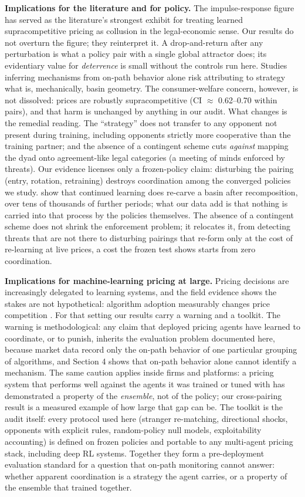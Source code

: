 \documentclass[sigconf]{acmart}
\begin{document}
\textbf{Implications for the literature and for policy.} The
impulse-response figure has served as the literature's strongest exhibit
for treating learned supracompetitive pricing as collusion in the
legal-economic sense. Our results do not overturn the figure; they
reinterpret it. A drop-and-return after any perturbation is what a
policy pair with a single global attractor does; its evidentiary value
for \emph{deterrence} is small without the controls run here. Studies
inferring mechanisms from on-path behavior alone risk attributing to
strategy what is, mechanically, basin geometry. The consumer-welfare
concern, however, is not dissolved: prices are robustly supracompetitive
(CI \ensuremath{\approx} 0.62--0.70 within pairs), and that harm is
unchanged by anything in our audit. What changes is the remedial
reading. The ``strategy'' does not transfer to any opponent not present
during training, including opponents strictly more cooperative than the
training partner; and the absence of a contingent scheme cuts
\emph{against} mapping the dyad onto agreement-like legal categories (a
meeting of minds enforced by threats). Our evidence licenses only a
frozen-policy claim: disturbing the pairing (entry, rotation,
retraining) destroys coordination among the converged policies we study.
\citet[Section VI.B]{calvano2020} show that continued learning does
re-carve a basin after recomposition, over tens of thousands of further
periods; what our data add is that nothing is carried into that process
by the policies themselves. The absence of a contingent scheme does not
shrink the enforcement problem; it relocates it, from detecting threats
that are not there to disturbing pairings that re-form only at the cost
of re-learning at live prices, a cost the frozen test shows starts from
zero coordination.

\textbf{Implications for machine-learning pricing at large.} Pricing
decisions are increasingly delegated to learning systems, and the field
evidence shows the stakes are not hypothetical: algorithm adoption
measurably changes price competition \citep{brown2023, assad2024}. For
that setting our results carry a warning and a toolkit. The warning is
methodological: any claim that deployed pricing agents have learned to
coordinate, or to punish, inherits the evaluation problem documented
here, because market data record only the on-path behavior of one
particular grouping of algorithms, and Section 4 shows that on-path
behavior alone cannot identify a mechanism. The same caution applies
inside firms and platforms: a pricing system that performs well against
the agents it was trained or tuned with has demonstrated a property of
the \emph{ensemble}, not of the policy; our cross-pairing result is a
measured example of how large that gap can be. The toolkit is the audit
itself: every protocol used here (stranger re-matching, directional
shocks, opponents with explicit rules, random-policy null models,
exploitability accounting) is defined on frozen policies and portable to
any multi-agent pricing stack, including deep RL systems. Together they
form a pre-deployment evaluation standard for a question that on-path
monitoring cannot answer: whether apparent coordination is a strategy
the agent carries, or a property of the ensemble that trained together.
\end{document}
